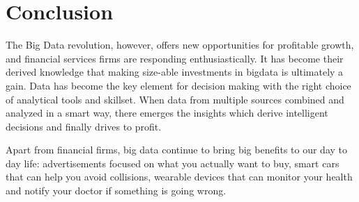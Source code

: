 \documentclass[sigconf]{acmart}
\begin{document}
\section{Conclusion}
The Big Data revolution, however, offers new opportunities
for profitable growth, and financial services firms are responding enthusiastically. It has become their derived knowledge that making size-able investments in bigdata is ultimately a gain. Data has become the key element for decision making with the right choice of analytical tools and skillset. When data from multiple sources combined and analyzed in a smart way, there emerges the insights which derive intelligent decisions and finally drives to profit.

Apart from financial firms, big data continue to bring big benefits to our day to day life: advertisements focused on what you actually want to buy, smart cars that can help you avoid collisions, wearable devices that can monitor your health and notify your doctor if something is going wrong. 



 
\end{document}
